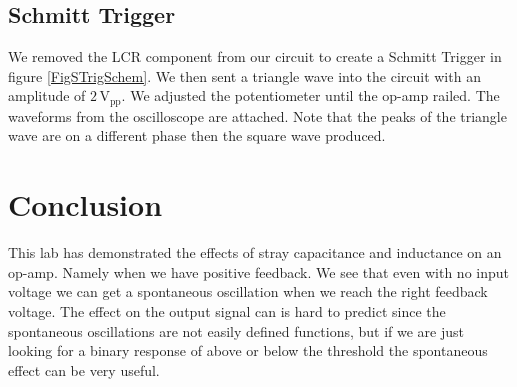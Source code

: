 \documentclass[11pt]{article}
\numberwithin{equation}{section}
\numberwithin{figure}{section}
\numberwithin{table}{section}
\newcommand{\unit}[1]{\ensuremath{\, \mathrm{#1}}}
\begin{document}
\subsection{Schmitt Trigger}
We removed the LCR component from our circuit to create a Schmitt Trigger in figure \ref{FigSTrigSchem}. We then sent a triangle wave into the circuit with an amplitude of $2\unit{V_{pp}}$. We adjusted the potentiometer until the op-amp railed. The waveforms from the oscilloscope are attached. Note that the peaks of the triangle wave are on a different phase then the square wave produced.

\section{Conclusion}
This lab has demonstrated the effects of stray capacitance and inductance on an op-amp. Namely when we have positive feedback. We see that even with no input voltage we can get a spontaneous oscillation when we reach the right feedback voltage. The effect on the output signal can is hard to predict since the spontaneous oscillations are not easily defined functions, but if we are just looking for a binary response of above or below the threshold the spontaneous effect can be very useful.
\end{document}
